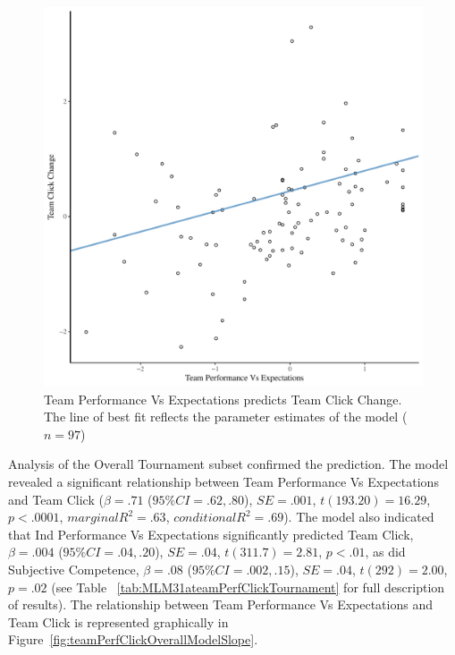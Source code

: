 \begin{CJK}{UTF8}{gbsn}


    \begin{figure}[htbp]
      \centering
    \includegraphics[scale=.5]{images/teamPerfClickDeltaModelSlope.pdf}
      \caption{Team Performance Vs Expectations predicts Team Click Change. The line of best fit reflects the parameter estimates of the model ($n = 97$)}
      \label{fig:teamPerfClickDeltaModelSlope}
    \end{figure}


Analysis of the Overall Tournament subset confirmed the prediction.
The model revealed a significant relationship between Team Performance Vs Expectations and Team Click ($\beta = .71$ ($95\% CI = .62, .80$), $SE = .001$, $t(193.20) = 16.29$, $p < .0001$, $marginal R^2 = .63$, $conditional R^2 = .69$).
The model also indicated that Ind Performance Vs Expectations significantly predicted Team Click, $\beta = .004$ ($95\% CI =  .04, .20$), $SE = .04$, $t(311.7) = 2.81$, $p < .01$, as did Subjective Competence, $\beta = .08$ ($95\% CI =  .002, .15$), $SE = .04$, $t(292) = 2.00$, $p = .02$  (see Table ~\ref{tab:MLM31ateamPerfClickTournament} for full description of results).  The relationship between Team Performance Vs Expectations  and Team Click is represented graphically in Figure~\ref{fig:teamPerfClickOverallModelSlope}.


\end{CJK}
